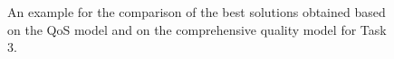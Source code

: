 \begin{figure}[h]
 \caption{An example for the comparison of the best solutions obtained based on the QoS model and on the comprehensive quality model for Task 3.}
 \label{comparisontest}
\end{figure}





